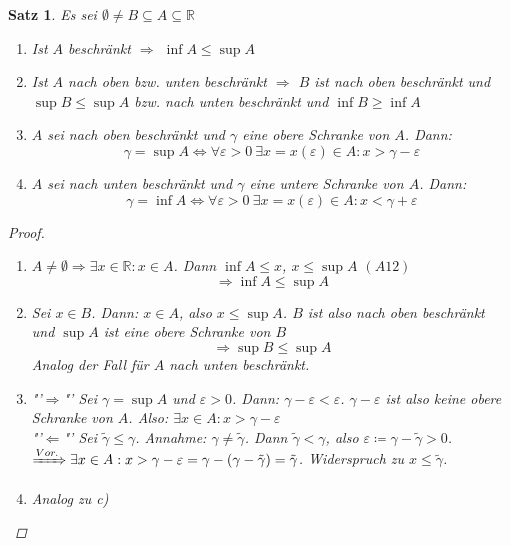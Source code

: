 \documentclass[12pt]{extreport} %
\newcommand{\R}{\mathbb{R}}
\theoremstyle{named}
\theoremstyle{dotless}
\newtheorem{satz}[unnamedtheorem]{Satz}
\begin{document}
\begin{satz} \label{1.2:satz}
	Es sei $\emptyset \neq B \subseteq A \subseteq \R$
	\begin{enumerate}
		\item Ist $A$ beschränkt $\Rightarrow$ $\inf A \leq \sup A$
		\item Ist $A$ nach oben bzw. unten beschränkt $\Rightarrow$ $B$ ist nach oben beschränkt und $\sup B \leq \sup A$ bzw. nach unten beschränkt und $\inf B \geq \inf A$
		\item $A$ sei nach oben beschränkt und $\gamma$ eine obere Schranke von $A$. Dann:
			$$
				\gamma = \sup A \iff \forall \varepsilon > 0 ~\exists x = x(\varepsilon) \in A : x > \gamma - \varepsilon
			$$
		\item $A$ sei nach unten beschränkt und $\gamma$ eine untere Schranke von $A$. Dann:
			$$
				\gamma = \inf A \iff \forall \varepsilon > 0 ~\exists x = x(\varepsilon) \in A : x < \gamma + \varepsilon
			$$	
	\end{enumerate}

	\begin{proof} ~\ 
		\begin{enumerate}
			\item $A \neq \emptyset \Rightarrow \exists x \in \R : x \in A$. Dann $\inf A \leq x$, $x \leq \sup A$ $(A12)$
			$$ \Rightarrow \inf A \leq \sup A $$
			\item Sei $x \in B$. Dann: $x \in A$, also $x \leq \sup A$. $B$ ist also nach oben beschränkt und $\sup A$ ist eine obere Schranke von $B$
			$$ \Rightarrow \sup B \leq \sup A $$
			Analog der Fall für $A$ nach unten beschränkt.
			\item "'$\Rightarrow$"' Sei $\gamma = \sup A$ und $\varepsilon > 0$. Dann: $\gamma - \varepsilon < \varepsilon$. $\gamma - \varepsilon$ ist also keine obere Schranke von $A$. Also: $\exists x \in A : x > \gamma - \varepsilon$ \\
				"'$\Leftarrow$"' Sei $\tilde{\gamma} \leq \gamma$. Annahme: $\gamma \neq \tilde{\gamma}$. Dann $\tilde{\gamma} < \gamma$, also $\varepsilon \coloneqq \gamma - \tilde{\gamma} > 0$.\\
				$\xRightarrow[]{Vor.} \exists x \in A: x > \gamma - \varepsilon = \gamma- (\gamma - \tilde{\gamma}) = \tilde{\gamma}$. Widerspruch zu $x \leq \tilde{\gamma}$.
			\item Analog zu c)
		\end{enumerate}
	\end{proof}
\end{satz}
\end{document}
